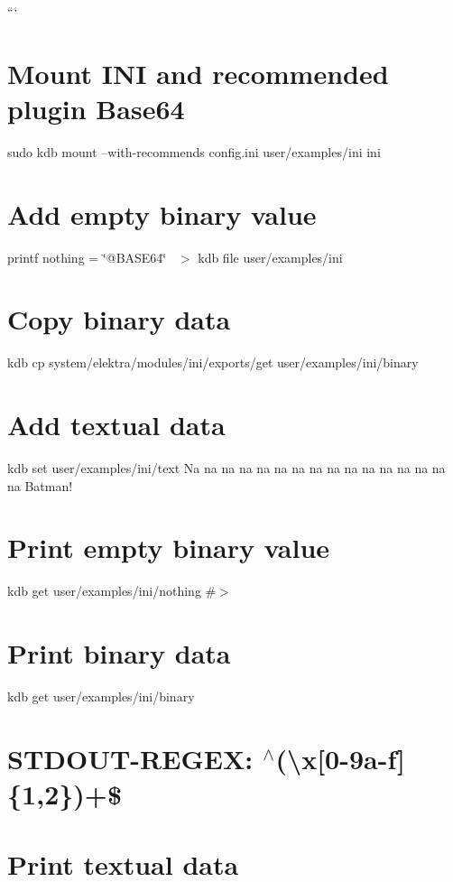 ``` \section*{Mount I\+NI and recommended plugin Base64}

sudo kdb mount --with-\/recommends config.\+ini user/examples/ini ini

\section*{Add empty binary value}

printf \textquotesingle{}nothing = \char`\"{}@\+B\+A\+S\+E64\char`\"{}~\newline
\textquotesingle{} $>$ {\ttfamily kdb file user/examples/ini} \section*{Copy binary data}

kdb cp system/elektra/modules/ini/exports/get user/examples/ini/binary \section*{Add textual data}

kdb set user/examples/ini/text \textquotesingle{}Na na na na na na na na na na na na na na na na Batman!\textquotesingle{}

\section*{Print empty binary value}

kdb get user/examples/ini/nothing \#$>$

\section*{Print binary data}

kdb get user/examples/ini/binary \section*{S\+T\+D\+O\+U\+T-\/\+R\+E\+G\+EX\+: $^\wedge$(\textbackslash{}x\mbox{[}0-\/9a-\/f\mbox{]}\{1,2\})+\$}

\section*{Print textual data}

